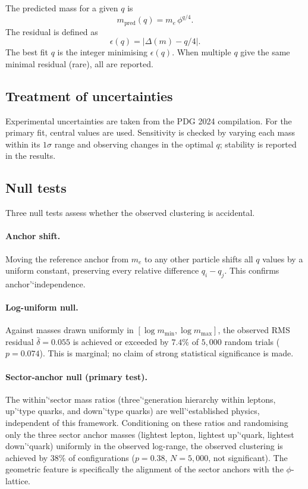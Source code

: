 ﻿\documentclass[12pt]{article}
\theoremstyle{definition}
\begin{document}
The predicted mass for a given $q$ is
\[
m_{\text{pred}}(q) = m_e \,\phi^{q/4}.
\]
The residual is defined as
\[
\epsilon(q) = \bigl|\Delta(m) - q/4\bigr|.
\]
The best fit $q$ is the integer minimising $\epsilon(q)$. When multiple $q$ give the same minimal residual (rare), all are reported.

\subsection{Treatment of uncertainties}
Experimental uncertainties are taken from the PDG 2024 compilation. For the primary fit, central values are used. Sensitivity is checked by varying each mass within its $1\sigma$ range and observing changes in the optimal $q$; stability is reported in the results.

\subsection{Null tests}
Three null tests assess whether the observed clustering is accidental.

\paragraph{Anchor shift.}
Moving the reference anchor from $m_e$ to any other particle shifts all $q$ values by a uniform constant, preserving every relative difference $q_i - q_j$. This confirms anchor'`independence.

\paragraph{Log-uniform null.}
Against masses drawn uniformly in $[\log m_{\min}, \log m_{\max}]$, the observed RMS residual $\bar\delta = 0.055$ is achieved or exceeded by $7.4\%$ of $5{,}000$ random trials ($p = 0.074$). This is marginal; no claim of strong statistical significance is made.

\paragraph{Sector-anchor null (primary test).}
The within'`sector mass ratios (three'`generation hierarchy within leptons, up'`type quarks, and down'`type quarks) are well'`established physics, independent of this framework. Conditioning on these ratios and randomising only the three sector anchor masses (lightest lepton, lightest up'`quark, lightest down'`quark) uniformly in the observed log-range, the observed clustering is achieved by $38\%$ of configurations ($p = 0.38$, $N = 5{,}000$, not significant). The geometric feature is specifically the alignment of the sector anchors with the $\phi$-lattice.
\end{document}
